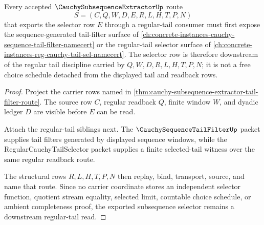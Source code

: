 \begin{theorem}
\label{thm:cauchy-subsequence-extractor-regular-tail-route}
Every accepted $\CauchySubsequenceExtractorUp$ route
$$
S=(C,Q,W,D,E,R,L,H,T,P,N)
$$
that exports the selector row $E$ through a regular-tail consumer must first expose the sequence-generated tail-filter surface of \autoref{ch:concrete-instances-cauchy-sequence-tail-filter-namecert} or the regular-tail selector surface of \autoref{ch:concrete-instances-reg-cauchy-tail-sel-namecert}. The selector row is therefore downstream of the regular tail discipline carried by $Q,W,D,R,L,H,T,P,N$; it is not a free choice schedule detached from the displayed tail and readback rows.
\end{theorem}
\begin{proof}
Project the carrier rows named in \autoref{thm:cauchy-subsequence-extractor-tail-filter-route}. The source row $C$, regular readback $Q$, finite window $W$, and dyadic ledger $D$ are visible before $E$ can be read.

Attach the regular-tail siblings next. The $\CauchySequenceTailFilterUp$ packet supplies tail filters generated by displayed sequence windows, while the RegularCauchyTailSelector packet supplies a finite selected-tail witness over the same regular readback route.

The structural rows $R,L,H,T,P,N$ then replay, bind, transport, source, and name that route. Since no carrier coordinate stores an independent selector function, quotient stream equality, selected limit, countable choice schedule, or ambient completeness proof, the exported subsequence selector remains a downstream regular-tail read.
\end{proof}
